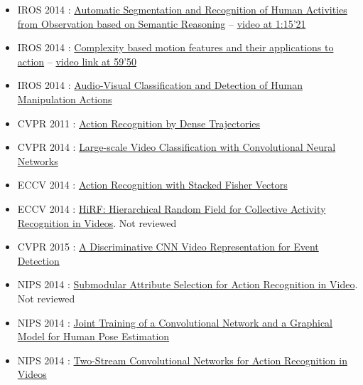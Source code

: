 \documentclass[a4paper]{article}
\begin{document}
		\begin{itemize}
			\item IROS 2014 : \href{http://mediatum.ub.tum.de/doc/1244178/00196267309484.pdf}{Automatic Segmentation and Recognition of Human Activities from Observation based on Semantic Reasoning}\cite{ramirez2014automatic} -- \href{https://www.youtube.com/watch?v=oeH1oy5Htz4}{video at 1:15'21}
			\item IROS 2014 : \href{https://www.deepdyve.com/lp/institute-of-electrical-and-electronics-engineers/complexity-based-motion-features-and-their-applications-to-action-xmhZ06qZYP}{Complexity based motion features and their applications to action}\cite{kwon2014complexity} -- \href{https://www.youtube.com/watch?v=hW_AEQnSdCs}{video link at 59'50}
			\item IROS 2014 : \href{http://www.csc.kth.se/~hedvig/publications/iros_14.pdf}{Audio-Visual Classification and Detection of Human Manipulation Actions}\cite{pieropan2014audio}

			\item CVPR 2011 : \href{https://hal.inria.fr/inria-00583818/document}{Action Recognition by Dense Trajectories}\cite{wang2011action}
			\item CVPR 2014 : \href{http://www.cv-foundation.org/openaccess/content_cvpr_2014/papers/Karpathy_Large-scale_Video_Classification_2014_CVPR_paper.pdf}{Large-scale Video Classification with Convolutional Neural Networks}\cite{karpathy2014large}
			\item ECCV 2014 : \href{http://pengxj.github.io/papers/PZQP_ECCV14_SFV.pdf}{Action Recognition with Stacked Fisher Vectors}\cite{peng2014action}
			\item ECCV 2014 : \href{http://web.engr.oregonstate.edu/~sinisa/research/publications/eccv14_HiRF.pdf}{HiRF: Hierarchical Random Field for Collective Activity Recognition in Videos}. Not reviewed
			\item  CVPR 2015 : \href{http://arxiv.org/pdf/1411.4006.pdf}{A Discriminative CNN Video Representation for Event Detection}\cite{xu2014discriminative}


			\item NIPS 2014 : \href{http://papers.nips.cc/paper/5565-submodular-attribute-selection-for-action-recognition-in-video.pdf}{Submodular Attribute Selection for Action Recognition in Video}. Not reviewed
			\item NIPS 2014 : \href{http://papers.nips.cc/paper/5573-joint-training-of-a-convolutional-network-and-a-graphical-model-for-human-pose-estimation.pdf}{Joint Training of a Convolutional Network and a Graphical Model for Human Pose Estimation}\cite{tompson2014joint}
			\item NIPS 2014 : \href{http://papers.nips.cc/paper/5353-two-stream-convolutional-networks-for-action-recognition-in-videos.pdf}{Two-Stream Convolutional Networks for Action Recognition in Videos}\cite{simonyan2014two}
		\end{itemize}
\end{document}
